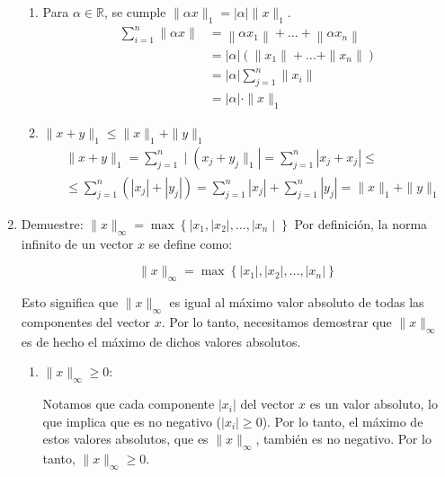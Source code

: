 \documentclass{report}
\begin{document}
\begin{enumerate}
\begin{enumerate}
            \item Para $\alpha \in \mathbb{R}$, se cumple $\| \alpha x \|_1 = | \alpha | \| x \|_1$.
            \begin{align*}
                \sum_{i=1}^n \| \alpha x \| &= \left\| \alpha x_1 \right\| + \ldots + \left\| \alpha x_n \right\| \\
                &= | \alpha | \left( \| x_1 \| + \ldots + \| x_n \| \right) \\
                &= | \alpha | \sum_{j=1}^n \| x_i \| \\
                &= | \alpha | \cdot \| x \|_1
            \end{align*}
            
            \item $\| x + y \|_1 \leq \| x \|_1 + \| y \|_1$
            \begin{align*}
                & \| x + y \|_1 = \sum_{j=1}^n \mid \left( x_j + y_j \|_1 \right| = \sum_{j=1}^n \left| x_j + x_j \right| \leq \\
                & \leq \sum_{j=1}^n \left( \left| x_j \right| + \left| y_j \right| \right) = \sum_{j=1}^n \left| x_j \right| + \sum_{j=1}^n \left| y_j \right| = \| x \|_1 + \| y \|_1
            \end{align*}
        \end{enumerate}
        \item Demuestre:
            $\|x\|_{\infty}=\max \left\{\left|x_1,\right| x_2|, \ldots,| x_n \mid\right\}$
            Por definición, la norma infinito de un vector $x$ se define como:

            \[
            \|x\|_{\infty}=\max \left\{\left|x_1\right|,\left|x_2\right|, \ldots, \left|x_n\right|\right\}
            \]

            Esto significa que $\|x\|_{\infty}$ es igual al máximo valor absoluto de todas las componentes del vector $x$. Por lo tanto, necesitamos demostrar que $\|x\|_{\infty}$ es de hecho el máximo de dichos valores absolutos.

            \begin{enumerate}
                \item $\|x\|_{\infty} \geq 0$:
                
                Notamos que cada componente $\left|x_i\right|$ del vector $x$ es un valor absoluto, lo que implica que es no negativo ($\left|x_i\right| \geq 0$). Por lo tanto, el máximo de estos valores absolutos, que es $\|x\|_{\infty}$, también es no negativo. Por lo tanto, $\|x\|_{\infty} \geq 0$.
                

\end{enumerate}
\end{enumerate}
\end{document}
